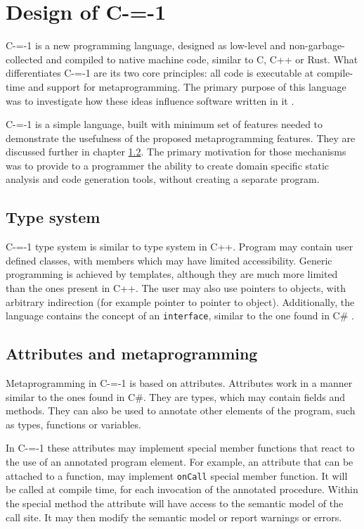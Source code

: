 \section{Design of C-=-1}
\label{language-design}
C-=-1 is a new programming language, designed as low-level and non-garbage-collected and compiled to native machine code, similar to C, C++ or Rust.
What differentiates C-=-1 are its two core principles: all code is executable at compile-time and support for metaprogramming.
The primary purpose of this language was to investigate how these ideas influence software written in it \cite{grabski2022compilation}.

C-=-1 is a simple language, built with minimum set of features needed to demonstrate the usefulness of the proposed metaprogramming features.
They are discussed further in chapter  \ref{design:attributes_and_metaprogramming}.
The primary motivation for those mechanisms was to provide to a programmer the ability to create domain specific static analysis and code generation tools, without creating a separate program.

\subsection{Type system}

C-=-1 type system is similar to type system in C++.
Program may contain user defined classes, with members which may have limited accessibility. Generic programming is achieved by  templates, although they are much more limited than the ones present in C++.
The user may also use pointers to objects, with arbitrary indirection (for example pointer to pointer to object).
Additionally, the language contains the concept of an \lstinline{interface}, similar to the one found in C\#  \cite{hejlsberg2003c}.

\subsection{Attributes and metaprogramming}
\label{design:attributes_and_metaprogramming}

Metaprogramming in C-=-1 is based on attributes. Attributes work in a manner similar to the ones found in C\#.
They are types, which may contain fields and methods.
They can also be used to annotate other elements of the program, such as types, functions or variables.

In C-=-1 these attributes may implement special member functions that react to the use of an annotated program element.
For example, an attribute that can be attached to a function, may implement \lstinline{onCall} special member function.
It will be called at compile time, for each invocation of the annotated procedure.
Within the special method the attribute will have access to the semantic model of the call site.
It may then modify the semantic model or report warnings or errors.

